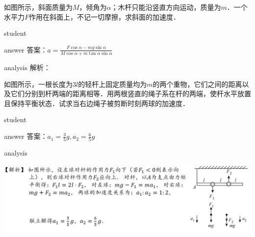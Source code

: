 \begin{example}
	如图所示，斜面质量为$ M $，倾角为$ \alpha $；木杆只能沿竖直方向运动，质量为$ m $．一个水平力$ F $作用在斜面上，不记一切摩擦，求斜面的加速度．
	
	\begin{taggedblock}{student}
		\vspace*{2cm}
	\end{taggedblock}
	
	
	\begin{taggedblock}{answer}
		答案：$ a = \frac{F\cos\alpha-mg\sin\alpha}{M\cos\alpha+m\tan\alpha\sin\alpha} $
	\end{taggedblock}
	
	
	\begin{taggedblock}{analysis}
		解析：
	\end{taggedblock}
\end{example}


\begin{example}
	如图所示，一根长度为$ 3l $的轻杆上固定质量均为$ m $的两个重物，它们之间的距离以及它们分别到杆两端的距离相等．用两根竖直的绳子系在杆的两端，使杆水平放置且保持平衡状态．试求当右边绳子被剪断时刻两球的加速度．
	
	\begin{taggedblock}{student}
		\vspace*{2cm}
	\end{taggedblock}
	
	
	\begin{taggedblock}{answer}
		答案：$ a_1 = \frac{3}{5}g,a_2 = \frac{6}{5}g $
	\end{taggedblock}
	
	
	\begin{taggedblock}{analysis}
		\begin{center}
			\includegraphics[width=\linewidth]{image/newton-22}
		\end{center}
	\end{taggedblock}
\end{example}


